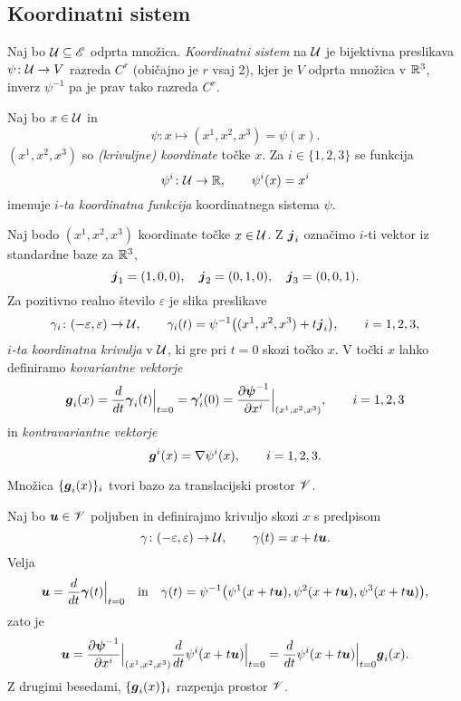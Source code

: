 \subsection{Koordinatni sistem}


\begin{definicija}
	Naj bo $\mathcal U\subseteq\mathscr E$ odprta množica. \emph{Koordinatni sistem} na $\mathcal U$ je bijektivna
	preslikava $\psi\colon \mathcal U\to V$ razreda $C^r$ (običajno je $r$ vsaj 2), kjer je $V$ odprta
	množica v $\mathbb R^3$, inverz $\psi^{-1}$ pa je prav tako razreda $C^r$.
\end{definicija}

Naj bo $x\in \mathcal U$ in
\[ \psi\colon x\mapsto (x^1,x^2,x^3)=\psi(x). \]
$(x^1,x^2,x^3)$ so \emph{(krivuljne) koordinate} točke $x$.
Za $i\in\{1,2,3\}$ se funkcija
\[ \psi^i\colon \mathcal U\to\mathbb R,\qquad \psi^i(x)=x^i \]
imenuje \emph{$i$-ta koordinatna funkcija} koordinatnega sistema $\psi$.

Naj bodo $(x^1,x^2,x^3)$ koordinate točke $x\in \mathcal U$. Z $\boldsymbol j_i$ označimo
$i$-ti vektor iz standardne baze za $\mathbb R^3$,
\[ \boldsymbol j_1=(1,0,0),\quad\boldsymbol j_2=(0,1,0),\quad\boldsymbol j_3=(0,0,1). \]
Za pozitivno realno število $\varepsilon$ je slika preslikave
\begin{equation} \label{e:kokri}
	\gamma_i\colon(-\varepsilon,\varepsilon)\to \mathcal U,\qquad
	\gamma_i(t)=\psi^{-1}\big((x^1,x^2,x^3)+t\boldsymbol j_i\big),\qquad i=1,2,3,
\end{equation}
\emph{$i$-ta koordinatna krivulja} v $\mathcal U$, ki gre pri $t=0$ skozi točko $x$.
V točki $x$ lahko definiramo \emph{kovariantne vektorje}
\begin{equation} \label{e:tanvek}
	\boldsymbol g_i(x)=\frac{d}{dt}\boldsymbol \gamma_i(t)\Big|_{t=0}=\boldsymbol \gamma_i'(0)
	=\frac{\partial\boldsymbol \psi^{-1}}{\partial x^i}\Big|_{(x^1,x^2,x^3)}
	, \qquad i=1,2,3
\end{equation}
in \emph{kontravariantne vektorje}
\begin{equation*} %
	\vek{g}^i(x)=\nabla\psi^i(x),\qquad i=1,2,3.
\end{equation*}

\begin{trditev}
	Množica $\{\boldsymbol g_i(x)\}_i$ tvori bazo za translacijski prostor $\mathscr V$.
\end{trditev}

\proof
	Naj bo $\boldsymbol u\in\mathscr V$ poljuben in definirajmo krivuljo skozi $x$ s predpisom
	\[ \gamma\colon(-\varepsilon,\varepsilon)\to \mathcal U,\qquad \gamma(t)=x+t\boldsymbol u. \]
	Velja
	\[
		\boldsymbol u=\frac{d}{dt}\boldsymbol \gamma(t)\Big|_{t=0}\quad\textrm{in}\quad
		\gamma(t)=\psi^{-1}\big(\psi^1(x+t\boldsymbol u),\psi^2(x+t\boldsymbol u),\psi^3(x+t\boldsymbol u)\big),
	\]
	zato je
	\[
		\boldsymbol u=
		\frac{\partial\boldsymbol \psi^{-1}}{\partial x^i}\Big|_{(x^1,x^2,x^3)}
		\frac{d}{dt}\psi^i(x+t\boldsymbol u)\Big|_{t=0}=
		\frac{d}{dt}\psi^i(x+t\boldsymbol u)\Big|_{t=0}\boldsymbol g_i(x).
	\]
	Z drugimi besedami, $\{\boldsymbol g_i(x)\}_{i}$ razpenja prostor $\mathscr V$.
\endproof

